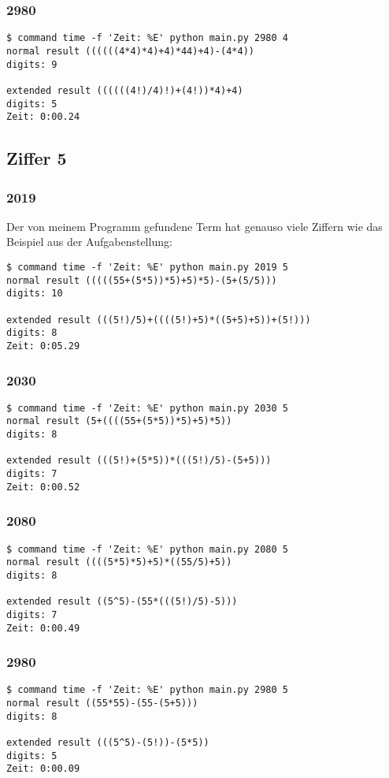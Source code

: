 \subsubsection{2980}
\begin{lstlisting}
$ command time -f 'Zeit: %E' python main.py 2980 4
normal result ((((((4*4)*4)+4)*44)+4)-(4*4))
digits: 9

extended result ((((((4!)/4)!)+(4!))*4)+4)
digits: 5
Zeit: 0:00.24
\end{lstlisting}
\subsection{Ziffer 5}
\subsubsection{2019}
Der von meinem Programm gefundene Term hat genauso viele Ziffern wie das Beispiel aus der Aufgabenstellung:
\begin{lstlisting}
$ command time -f 'Zeit: %E' python main.py 2019 5
normal result (((((55+(5*5))*5)+5)*5)-(5+(5/5)))
digits: 10

extended result (((5!)/5)+((((5!)+5)*((5+5)+5))+(5!)))
digits: 8
Zeit: 0:05.29
\end{lstlisting}
\subsubsection{2030}
\begin{lstlisting}
$ command time -f 'Zeit: %E' python main.py 2030 5
normal result (5+((((55+(5*5))*5)+5)*5))
digits: 8

extended result (((5!)+(5*5))*(((5!)/5)-(5+5)))
digits: 7
Zeit: 0:00.52
\end{lstlisting}
\subsubsection{2080}
\begin{lstlisting}
$ command time -f 'Zeit: %E' python main.py 2080 5
normal result ((((5*5)*5)+5)*((55/5)+5))
digits: 8

extended result ((5^5)-(55*(((5!)/5)-5)))
digits: 7
Zeit: 0:00.49
\end{lstlisting}
\subsubsection{2980}
\begin{lstlisting}
$ command time -f 'Zeit: %E' python main.py 2980 5
normal result ((55*55)-(55-(5+5)))
digits: 8

extended result (((5^5)-(5!))-(5*5))
digits: 5
Zeit: 0:00.09
\end{lstlisting}
